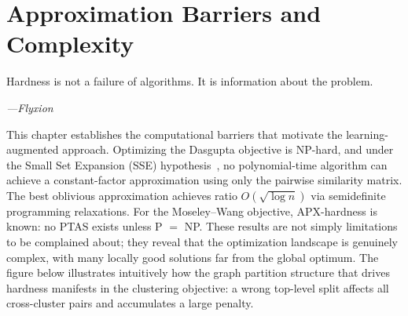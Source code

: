 \chapter{Approximation Barriers and Complexity}
\label{ch:hardness}

\epigraph{%
  Hardness is not a failure of algorithms. It is information about the problem.%
}{\textit{---Flyxion}}

This chapter establishes the computational barriers that motivate the learning-augmented approach. Optimizing the Dasgupta objective is NP-hard, and under the Small Set Expansion (SSE) hypothesis~\cite{Charikar2019,CohenAddad2019}, no polynomial-time algorithm can achieve a constant-factor approximation using only the pairwise similarity matrix. The best oblivious approximation achieves ratio $O(\sqrt{\log n})$ via semidefinite programming relaxations. For the Moseley--Wang objective, APX-hardness is known: no PTAS exists unless P $=$ NP. These results are not simply limitations to be complained about; they reveal that the optimization landscape is genuinely complex, with many locally good solutions far from the global optimum. The figure below illustrates intuitively how the graph partition structure that drives hardness manifests in the clustering objective: a wrong top-level split affects all cross-cluster pairs and accumulates a large penalty.

